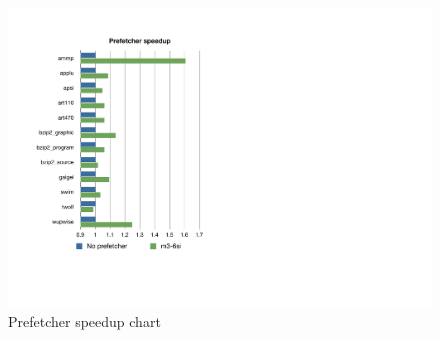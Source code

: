 \begin{figure}
\centering \includegraphics[scale=0.7]{img/prefetcher_chart.pdf}
\caption{Prefetcher speedup chart}
\label{fig:prefetcher_speedup}
\end{figure}